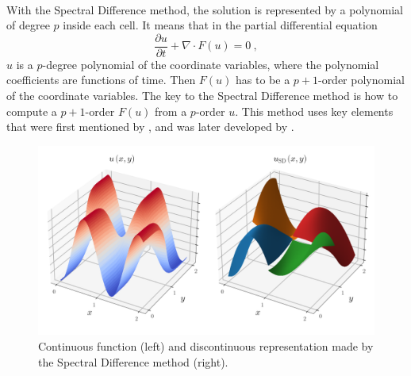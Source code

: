       \paragraph{}
      With the Spectral Difference method, the solution is represented by a polynomial of degree $p$ inside each cell.
      It means that in the partial differential equation
      \begin{equation}\label{eq:pde_2}
        \frac{\partial u}{\partial t} + \nabla \cdot F\left(u\right) = 0 \ ,
      \end{equation}
      $u$ is a $p$-degree polynomial of the coordinate variables, where the polynomial coefficients are functions of time.
      Then $F\left(u\right)$ has to be a $p\!+\!1$-order polynomial of the coordinate variables.
      The key to the Spectral Difference method is how to compute a $p + 1$-order $F\left(u\right)$ from a $p$-order $u$.
      This method uses key elements that were first mentioned by \cite{Kopriva1996}, and was later developed by \cite{LiuVinokurWang2006}.

      \begin{figure}
        \centering
        \includegraphics[width=\textwidth]{figures/sd_discontinuous.png}
        \caption{Continuous function (left) and discontinuous representation made by the Spectral Difference method (right).}
        \label{fig:sd_discontinuous}
      \end{figure}

